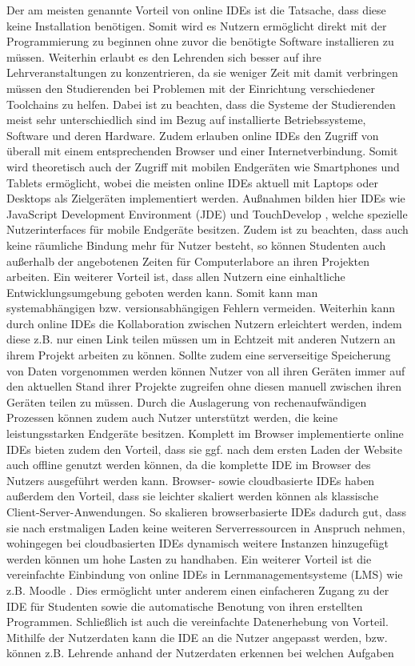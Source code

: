 Der am meisten genannte Vorteil von online IDEs ist die Tatsache, dass diese keine Installation benötigen. Somit wird es Nutzern ermöglicht direkt mit der Programmierung zu beginnen ohne zuvor die benötigte Software installieren zu müssen. Weiterhin erlaubt es den Lehrenden sich besser auf ihre Lehrveranstaltungen zu konzentrieren, da sie weniger Zeit mit damit verbringen müssen den Studierenden bei Problemen mit der Einrichtung verschiedener Toolchains zu helfen. Dabei ist zu beachten, dass die Systeme der Studierenden meist sehr unterschiedlich sind im Bezug auf installierte Betriebssysteme, Software und deren Hardware. Zudem erlauben online IDEs den Zugriff von überall mit einem entsprechenden Browser und einer Internetverbindung. Somit wird theoretisch auch der Zugriff mit mobilen Endgeräten wie Smartphones und Tablets ermöglicht, wobei die meisten online IDEs aktuell mit Laptops oder Desktops als Zielgeräten implementiert werden. Außnahmen bilden hier IDEs wie JavaScript Development Environment (JDE) \cite{uehara_javascript_2019} und TouchDevelop \cite{ball_beyond_2015}, welche spezielle Nutzerinterfaces für mobile Endgeräte besitzen. Zudem ist zu beachten, dass auch keine räumliche Bindung mehr für Nutzer besteht, so können Studenten auch außerhalb der angebotenen Zeiten für Computerlabore an ihren Projekten arbeiten.  Ein weiterer Vorteil ist, dass allen Nutzern eine einhaltliche Entwicklungsumgebung geboten werden kann. Somit kann man systemabhängigen bzw. versionsabhängigen Fehlern vermeiden. Weiterhin kann durch online IDEs die Kollaboration zwischen Nutzern erleichtert werden, indem diese z.B. nur einen Link teilen müssen um in Echtzeit mit anderen Nutzern an ihrem Projekt arbeiten zu können. Sollte zudem eine serverseitige Speicherung von Daten vorgenommen werden können Nutzer von all ihren Geräten immer auf den aktuellen Stand ihrer Projekte zugreifen ohne diesen manuell zwischen ihren Geräten teilen zu müssen. Durch die Auslagerung von rechenaufwändigen Prozessen können zudem auch Nutzer unterstützt werden, die keine leistungsstarken Endgeräte besitzen. Komplett im Browser implementierte online IDEs bieten zudem den Vorteil, dass sie ggf. nach dem ersten Laden der Website auch offline genutzt werden können, da die komplette IDE im Browser des Nutzers ausgeführt werden kann.  Browser- sowie cloudbasierte IDEs haben außerdem den Vorteil, dass sie leichter skaliert werden können als klassische Client-Server-Anwendungen. So skalieren browserbasierte IDEs dadurch gut, dass sie nach erstmaligen Laden keine weiteren Serverressourcen in Anspruch nehmen, wohingegen bei cloudbasierten IDEs dynamisch weitere Instanzen hinzugefügt werden können um hohe Lasten zu handhaben. Ein weiterer Vorteil ist die vereinfachte Einbindung von online IDEs in Lernmanagementsysteme (LMS) wie z.B. Moodle . Dies ermöglicht unter anderem einen einfacheren Zugang zu der IDE für Studenten sowie die automatische Benotung von ihren erstellten Programmen.  Schließlich ist auch die vereinfachte Datenerhebung von Vorteil. Mithilfe der Nutzerdaten kann die IDE an die Nutzer angepasst werden, bzw. können z.B. Lehrende anhand der Nutzerdaten erkennen bei welchen Aufgaben 